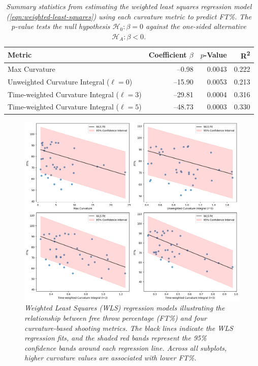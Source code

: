 \documentclass{article}
\begin{document}
    \begin{table}[H]
        \centering
        \begin{tabular}{lrrr}
        \toprule
        \textbf{Metric} & \textbf{Coefficient} $\beta$ & $p$-\textbf{Value} & \textbf{R\textsuperscript{2}}\\
        \midrule
        Max Curvature                               &   --0.98  & 0.0043  & 0.222 \\
        Unweighted Curvature Integral ($\ell=0$)    &  --15.90  & 0.0053  & 0.213 \\
        Time-weighted Curvature Integral ($\ell=3$) &  --29.81  & 0.0004  & 0.316 \\
        Time-weighted Curvature Integral ($\ell=5$) &  --48.73  & 0.0003  & 0.330 \\
        \bottomrule
        \end{tabular}
        \caption{\it Summary statistics from estimating the weighted least squares regression model (\ref{eqn:weighted-least-squares}) using each curvature metric to predict FT\%. The $p$-value tests the null hypothesis $\mathcal{H}_0 : \beta = 0$ against the one-sided alternative $\mathcal{H}_A : \beta < 0$.}
        \label{tab:wls-results}
    \end{table}
    
    \begin{figure}[H]
        \centering
        \includegraphics[width=0.6\linewidth]{reports/arxiv/regressionlines.png}
        \caption{\it Weighted Least Squares (WLS) regression models illustrating the relationship between free throw percentage (FT\%) and four curvature-based shooting metrics. The black lines indicate the WLS regression fits, and the shaded red bands represent the 95\% confidence bands around each regression line. Across all subplots, higher curvature values are associated with lower FT\%.}
        \label{fig:regressionlines}
    \end{figure}
\end{document}
